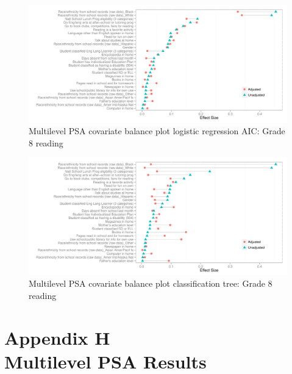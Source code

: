 \begin{figure}[h!]
\begin{center}
\includegraphics[width=\textwidth]{../Figures2009/g8read-mlpsa-lrAIC-balance.pdf}
\caption{Multilevel PSA covariate balance plot logistic regression AIC: Grade 8 reading}
\end{center}
\end{figure}

\begin{figure}[h!]
\begin{center}
\includegraphics[width=\textwidth]{../Figures2009/g8read-mlpsa-ctree-balance.pdf}
\caption{Multilevel PSA covariate balance plot classification tree: Grade 8 reading}
\end{center}
\end{figure}


\clearpage
{}
\section*{Appendix H\\Multilevel PSA Results}

